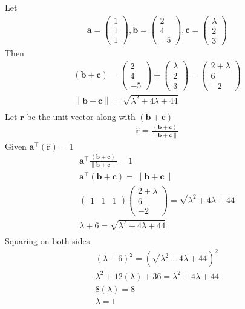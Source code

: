 \documentclass[12pt]{article}
\providecommand{\brak}[1]{\ensuremath{\left(#1\right)}}
\providecommand{\norm}[1]{\left\lVert#1\right\rVert}
\newcommand{\myvec}[1]{\ensuremath{\begin{pmatrix}#1\end{pmatrix}}}
\let\vec\mathbf
\begin{document}
\begin{enumerate}
Let
\begin{align}
\vec{a} =\myvec{1\\1\\1} , \vec{b}=\myvec{2\\4\\-5} , \vec{c}=\myvec{\lambda\\2\\3}
\end{align}
Then
\begin{align}
\brak{\vec{b}+\vec{c}}=\myvec{2\\4\\-5}+\myvec{\lambda\\2\\3}=\myvec{2+\lambda\\6\\-2}\\
{\norm{\vec{b}+\vec{c}}}={\sqrt{\lambda^2+4\lambda+44}}\\
\end{align}
Let $\vec{r}$ be the unit vector along with $\brak{\vec{b}+\vec{c}}$
\begin{align}
\hat{\vec{r}}=\frac{\brak{\vec{b}+\vec{c}}}{\norm{\vec{b}+\vec{c}}}
\end{align}
Given $\vec{a}^\top\brak{\vec{\hat{r}}} = 1$
\begin{align}
\vec{a}^\top\frac{\brak{\vec{b}+\vec{c}}}{\norm{\vec{b}+\vec{c}}}=1\\
\vec{a}^\top\brak{\vec{b}+\vec{c}}={\norm{\vec{b}+\vec{c}}}\\
\myvec{1&1&1}\myvec{2+\lambda \\ 6 \\ -2}= {\sqrt{\lambda^2+4\lambda+44}} \\
\lambda+6 = {\sqrt{\lambda^2+4\lambda+44}}\\
\end{align}
Squaring on both sides
\begin{align}
\brak{\lambda+6}^2 = \brak{{\sqrt{\lambda^2+4\lambda+44}}}^2\\
\lambda^2+12\brak{\lambda}+36 = \lambda^2+4\lambda+44\\
8\brak{\lambda} = 8\\
\lambda = 1
\end{align}
\begin{center}

\end{center}
\end{enumerate}
\end{document}
